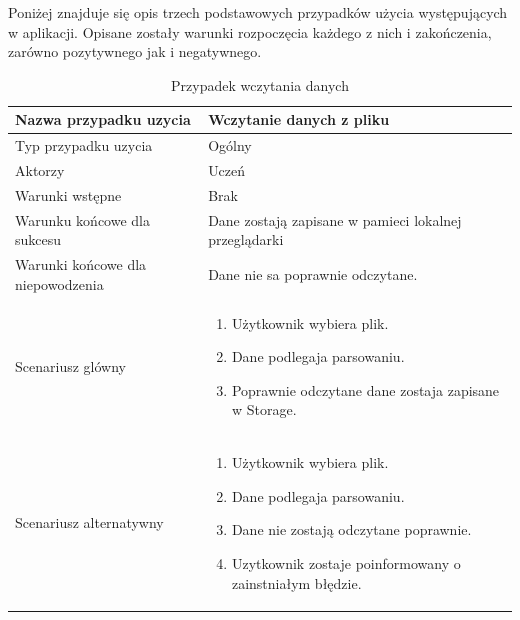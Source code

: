 Poniżej znajduje się opis trzech podstawowych przypadków użycia występujących w aplikacji. Opisane zostały warunki rozpoczęcia każdego z nich i zakończenia, zarówno pozytywnego jak i negatywnego.

\begin{table}[H]
    \centering
    \begin{tabular}{|l<{\raggedright}|p{3in}|}
    \hline
    Nazwa przypadku uzycia & Wczytanie danych z pliku  \\ \hline
    Typ przypadku uzycia  & Ogólny  \\ \hline
    Aktorzy   & Uczeń    \\ \hline
    Warunki wstępne   & Brak     \\ \hline
    Warunku końcowe dla sukcesu   & Dane zostają zapisane w pamieci lokalnej przeglądarki    \\ \hline
    Warunki końcowe dla niepowodzenia   & Dane nie sa poprawnie odczytane.     \\ \hline
    Scenariusz glówny   &

    \begin{enumerate}
    \itemsep0em
        \item Użytkownik wybiera plik.
        \item Dane podlegaja parsowaniu.
        \item Poprawnie odczytane dane zostaja zapisane w Storage.
    \end{enumerate}
     \\ \hline
    Scenariusz alternatywny   &

    \begin{enumerate}
    \itemsep0em
        \item Użytkownik wybiera plik.
        \item Dane podlegaja parsowaniu.
        \item Dane nie zostają odczytane poprawnie.
        \item Uzytkownik zostaje poinformowany o zainstniałym błędzie.
    \end{enumerate}
         \\ \hline
    \end{tabular}
    \caption{Przypadek wczytania danych}
    \label{tab:caseuse1}
\end{table}

